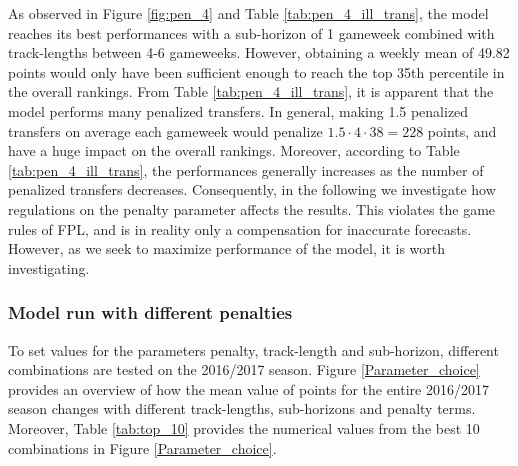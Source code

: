 As observed in Figure \ref{fig:pen_4} and Table \ref{tab:pen_4_ill_trans}, the model reaches its best performances with a sub-horizon of 1 gameweek combined with track-lengths between 4-6 gameweeks. However, obtaining a weekly mean of 49.82 points would only have been sufficient enough to reach the top 35th percentile in the overall rankings. From Table \ref{tab:pen_4_ill_trans}, it is apparent that the model performs many penalized transfers. In general, making 1.5 penalized transfers on average each gameweek would penalize $1.5\cdot4\cdot38 = 228$ points, and have a huge impact on the overall rankings. Moreover, according to Table \ref{tab:pen_4_ill_trans}, the performances generally increases as the number of penalized transfers decreases. Consequently, in the following we investigate how regulations on the penalty parameter affects the results. This violates the game rules of FPL, and is in reality only a compensation for inaccurate forecasts. However, as we seek to maximize performance of the model, it is worth investigating. 


\subsubsection{Model run with different penalties}

To set values for the parameters penalty, track-length and sub-horizon, different combinations are tested on the 2016/2017 season. Figure \ref{Parameter_choice} provides an overview of how the mean value of points for the entire 2016/2017 season changes with different track-lengths, sub-horizons and penalty terms. Moreover, Table \ref{tab:top_10} provides the numerical values from the best 10 combinations in Figure \ref{Parameter_choice}.


\newpar

